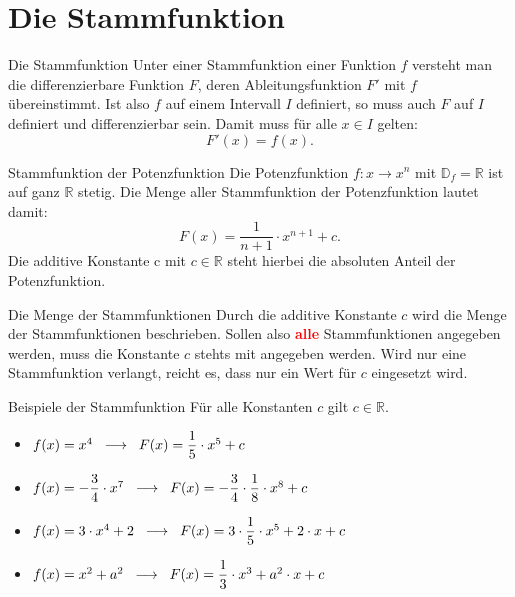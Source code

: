 \section{Die Stammfunktion}
\begin{defi}{Die Stammfunktion}{}
    Unter einer Stammfunktion einer Funktion $f$ versteht man die differenzierbare Funktion $F$, deren Ableitungsfunktion $F'$ mit $f$ übereinstimmt. Ist also $f$ auf einem Intervall $I$ definiert, so muss auch $F$ auf $I$ definiert und differenzierbar sein. Damit muss für alle $x\in I$ gelten: $$F'(x)= f(x).$$
\end{defi}
\begin{satz}{Stammfunktion der Potenzfunktion}{}
    Die Potenzfunktion $f: x \longrightarrow x^n$  mit $\mathds{D}_f = \mathds{R}$ ist auf ganz $\mathds{R}$ stetig. Die Menge aller Stammfunktion der Potenzfunktion lautet damit: $$F(x)= \dfrac{1}{n+1} \cdot x^{n+1} + c .$$
    Die additive Konstante c mit $c\in\mathds{R}$ steht hierbei die absoluten Anteil der Potenzfunktion.
\end{satz}
\begin{b8d}{Die Menge der Stammfunktionen}{}
Durch die additive Konstante $c$ wird die Menge der Stammfunktionen beschrieben. Sollen also {\bfseries\textcolor{red}{alle}} Stammfunktionen angegeben werden, muss die Konstante $c$ stehts mit angegeben werden. Wird nur eine Stammfunktion verlangt, reicht es, dass nur ein Wert für $c$ eingesetzt wird.
\end{b8d}
\begin{bsp}{Beispiele der Stammfunktion}{}
Für alle Konstanten $c$ gilt $c\in \mathds{R}$.
\begin{itemize}
    \item $f(x) = x^4 \hspace{0.2cm} \longrightarrow \hspace{0.2cm} F(x) = \dfrac{1}{5}\cdot x^5 + c $
    \item $f(x) = -\dfrac{3}{4}\cdot x^7 \hspace{0.2cm} \longrightarrow \hspace{0.2cm} F(x)= -\dfrac{3}{4} \cdot \dfrac{1}{8} \cdot x^8 + c$
    \item $f(x)= 3\cdot x^4 + 2 \hspace{0.2cm} \longrightarrow \hspace{0.2cm} F(x) = 3\cdot \dfrac{1}{5}\cdot x^5 + 2\cdot x + c$
    \item $f(x) = x^2 +a^2 \hspace{0.2cm} \longrightarrow \hspace{0.2cm} F(x)= \dfrac{1}{3} \cdot x^3 + a^2 \cdot x + c$
\end{itemize}
\end{bsp}
